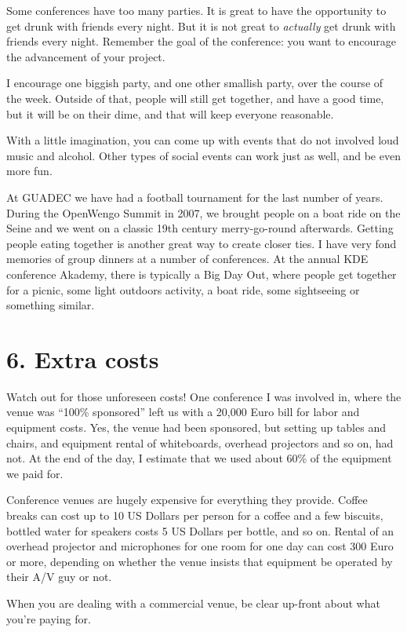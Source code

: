 Some conferences have too many parties. It is great to have the
opportunity to get drunk with friends every night. But it is not great to
\textit{actually} get drunk with friends every night. Remember the goal of the
conference: you want to encourage the advancement of your project.

I encourage one biggish party, and one other smallish party, over the
course of the week. Outside of that, people will still get together, and
have a good time, but it will be on their dime, and that will keep
everyone reasonable.

With a little imagination, you can come up with events that do not
involved loud music and alcohol. Other types of social events can work
just as well, and be even more fun.

At GUADEC we have had a football tournament for the last number of
years. During the OpenWengo Summit in 2007, we brought people on a boat
ride on the Seine and we went on a classic 19th century merry-go-round
afterwards. Getting people eating together is another great way to
create closer ties. I have very fond memories of group dinners at a
number of conferences. At the annual KDE conference Akademy, there is
typically a Big Day Out, where people get together for a picnic, some
light outdoors activity, a boat ride, some sightseeing or something similar.

\section*{6. Extra costs}

Watch out for those unforeseen costs! One conference I was involved in,
where the venue was ``100\% sponsored'' left us with a 20,000 Euro bill for
labor and equipment costs. Yes, the venue had been sponsored, but
setting up tables and chairs, and equipment rental of whiteboards,
overhead projectors and so on, had not. At the end of the day, I
estimate that we used about 60\% of the equipment we paid for.

Conference venues are hugely expensive for everything they provide.
Coffee breaks can cost up to 10 US Dollars per person for a coffee and a few
biscuits, bottled water for speakers costs 5 US Dollars per bottle, and so on.
Rental of an overhead projector and microphones for one room for one day can
cost 300 Euro or more, depending on whether the venue insists that equipment
be operated by their A/V guy or not.

When you are dealing with a commercial venue, be clear up-front about
what you're paying for.

